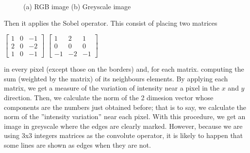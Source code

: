 \documentclass{article}
\begin{document}
\begin{figure}[htbp]
    \centering
    \caption{(a) RGB image (b) Greyscale image }
\end{figure}

Then it applies the Sobel operator. This consist of placing two matrices

\begin{center}
$\begin{bmatrix}
    1 & 0 & -1\\
    2 & 0 & -2\\
    1 & 0 & -1
\end{bmatrix}$ \qquad $\begin{bmatrix}
        1 & 2 & 1\\
        0 & 0 & 0\\
       -1 & -2 & -1
\end{bmatrix}$
\end{center}
in every pixel (except those on the borders) and, for each matrix. computing the sum (weighted by the matrix) of its neighbours elements. By applying each matrix, we get a measure of the variation of intensity near a pixel in the $x$ and $y$ direction. Then, we calculate the norm of the 2 dimesion vector whose components are the numbers just obtained before; that is to say, we calculate the norm of the ''intensity variation'' near each pixel. With this procedure, we get an image in greyscale where the edges are clearly marked. However, because we are using 3x3 integers matrices as the convolute operator, it is likely to happen that some lines are shown as edges when they are not. 
\end{document}
